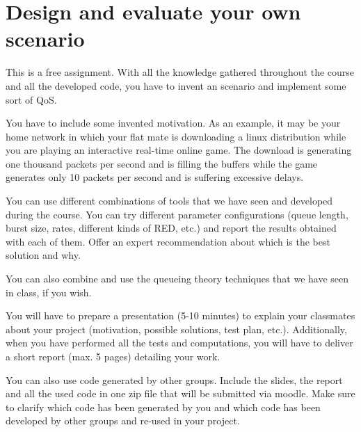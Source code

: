\section{Design and evaluate your own scenario}

This is a free assignment.
With all the knowledge gathered throughout the course and all the developed code, you have to invent an scenario and implement some sort of QoS.

You have to include some invented motivation.
As an example, it may be your home network in which your flat mate is downloading a linux distribution while you are playing an interactive real-time online game.
The download is generating one thousand packets per second and is filling the buffers while the game generates only 10 packets per second and is suffering excessive delays.

You can use different combinations of tools that we have seen and developed during the course.
You can try different parameter configurations (queue length, burst size, rates, different kinds of RED, etc.) and report the results obtained with each of them.
Offer an expert recommendation about which is the best solution and why.

You can also combine and use the queueing theory techniques that we have seen in class, if you wish.

You will have to prepare a presentation (5-10 minutes) to explain your classmates about your project (motivation, possible solutions, test plan, etc.).
Additionally, when you have performed all the tests and computations, you will have to deliver a short report (max. 5 pages) detailing your work.

You can also use code generated by other groups.
Include the slides, the report and all the used code in one zip file that will be submitted via moodle.
Make sure to clarify which code has been generated by you and which code has been developed by other groups and re-used in your project.

